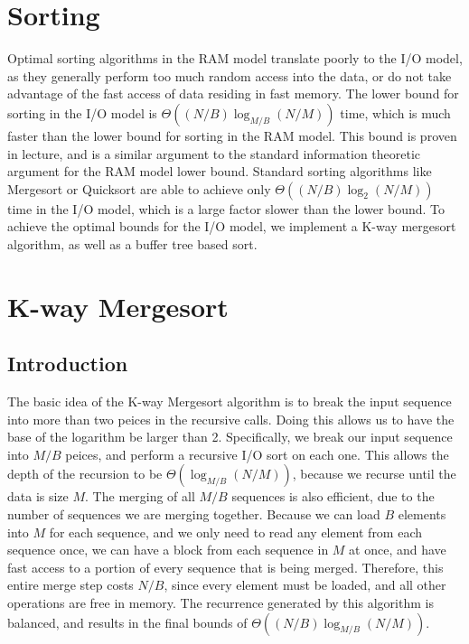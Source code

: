 \documentclass{article}
\begin{document}
\section{Sorting}
Optimal sorting algorithms in the RAM model translate poorly to the
I/O model, as they generally perform too much random access into the data,
or do not take advantage of the fast access of data residing in fast memory.
%
The lower bound for sorting in the I/O model is $\Theta((N/B)\log_{M/B}(N/M))$ time,
which is much faster than the lower bound for sorting in the RAM model.
%
This bound is proven in lecture, and is a similar argument to the standard
information theoretic argument for the RAM model lower bound.
%
Standard sorting algorithms like Mergesort or Quicksort are able to achieve
only $\Theta((N/B)\log_{2}(N/M))$ time in the I/O model, which is a large factor
slower than the lower bound.
%
To achieve the optimal bounds for the I/O model, we implement a K-way
mergesort algorithm, as well as a buffer tree based sort.

\section{K-way Mergesort}

\subsection{Introduction}
The basic idea of the K-way Mergesort algorithm is to break
the input sequence into more than two peices in
the recursive calls.
%
Doing this allows us to have the base of the logarithm be larger
than 2.
%
Specifically, we break our input sequence into $M/B$ peices,
and perform a recursive I/O sort on each one.
%
This allows the depth of the recursion to be $\Theta(\log_{M/B}(N/M))$,
because we recurse until the data is size $M$.
%
The merging of all $M/B$ sequences is also efficient, due to the number
of sequences we are merging together.
%
Because we can load $B$ elements into $M$ for each sequence, and
we only need to read any element from each sequence once, we can
have a block from each sequence in $M$ at once, and have
fast access to a portion of every sequence that is being merged.
%
Therefore, this entire merge step costs $N/B$, since every element must be
loaded, and all other operations are free in memory.
%
The recurrence generated by this algorithm is balanced, and results in
the final bounds of $\Theta((N/B)\log_{M/B}(N/M))$.
\end{document}
